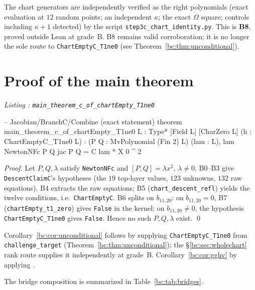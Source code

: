 \documentclass[a4paper,11pt]{article}
\newcounter{leanlisting}
\newenvironment{leanlisting}[2]{%
  \refstepcounter{leanlisting}\label{#2}%
  \begin{center}\textit{\small Listing \theleanlisting: #1}\end{center}%
  \Verbatim[breaklines=true,breakanywhere=true,fontsize=\footnotesize,frame=single,framesep=4pt,rulecolor=\color{gray!50},fillcolor=\color{gray!5}]%
}{%
  \endVerbatim%
}
\theoremstyle{plain}
\theoremstyle{definition}
\theoremstyle{remark}
\begin{document}
The chart generators are independently verified as the right polynomials (exact evaluation at $12$ random points; an independent $\kappa$; the exact $\Omega$ square; controls including $\kappa+1$ detected) by the script \texttt{step3c\_chart\_identity.py}. This is \textbf{B8}, proved outside Lean at grade~B. B8 remains valid corroboration; it is no longer the sole route to \texttt{ChartEmptyC\_T1ne0} (see Theorem~\ref{bc:thm:unconditional}).

\section{Proof of the main theorem}\label{bc:sec:proof}

\begin{leanlisting}{\texttt{main\_theorem\_c\_of\_chartEmpty\_T1ne0}}{bc:lst:main}
-- Jacobian/BranchC/Combine (exact statement)
theorem main_theorem_c_of_chartEmpty_T1ne0
    {L : Type*} [Field L] [CharZero L]
    (h : ChartEmptyC_T1ne0 L) :
    \lnot \exists (P Q : MvPolynomial (Fin 2) L) (lam : L),
      lam  \land NewtonNFc P Q \land jac P Q = C lam * X 0 ^ 2
\end{leanlisting}

\emph{Proof.} Let $P,Q,\lambda$ satisfy \texttt{NewtonNFc} and $[P,Q]=\lambda x^2$, $\lambda\ne0$. B0--B3 give \texttt{DescentClaimC}'s hypotheses (the $19$ top-layer values, $123$ unknowns, $132$ raw equations). B4 extracts the raw equations; B5 (\texttt{chart\_descent\_refl}) yields the twelve conditions, i.e.\ \texttt{ChartEmptyC}. B6 splits on $b_{11,20}$: on $b_{11,20}=0$, B7 (\texttt{chartEmpty\_t1\_zero}) gives \texttt{False} in the kernel; on $b_{11,20}\ne0$, the hypothesis \texttt{ChartEmptyC\_T1ne0} gives \texttt{False}. Hence no such $P,Q,\lambda$ exist. \qed

Corollary~\ref{bc:cor:unconditional} follows by supplying \texttt{ChartEmptyC\_T1ne0} from \texttt{challenge\_target} (Theorem~\ref{bc:thm:unconditional}); the \S\ref{bc:sec:wholechart} rank route supplies it independently at grade~B. Corollary~\ref{bc:cor:gghv} by applying \cite[Proposition~4.3]{GGHV}.

The bridge composition is summarized in Table~\ref{bc:tab:bridges}.
\end{document}
